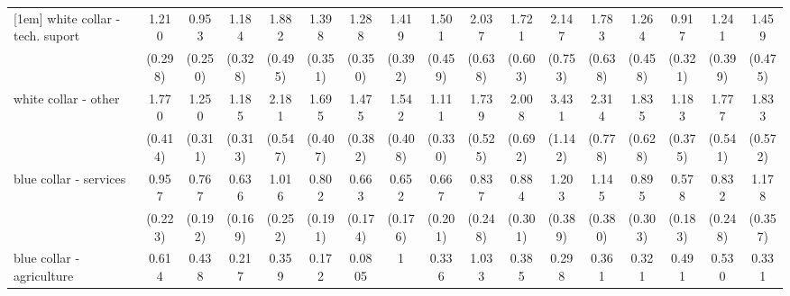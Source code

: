 {\begin{tabular}{l*{16}{c}}
[1em]
white collar - tech. suport&       1.210         &       0.953         &       1.184         &       1.882\sym{*}  &       1.398         &       1.288         &       1.419         &       1.501         &       2.037\sym{*}  &       1.721         &       2.147\sym{*}  &       1.783         &       1.264         &       0.917         &       1.241         &       1.459         \\
                    &     (0.298)         &     (0.250)         &     (0.328)         &     (0.495)         &     (0.351)         &     (0.350)         &     (0.392)         &     (0.459)         &     (0.638)         &     (0.603)         &     (0.753)         &     (0.638)         &     (0.458)         &     (0.321)         &     (0.399)         &     (0.475)         \\
[1em]
white collar - other&       1.770\sym{*}  &       1.250         &       1.185         &       2.181\sym{**} &       1.695\sym{*}  &       1.475         &       1.542         &       1.111         &       1.739         &       2.008\sym{*}  &       3.431\sym{***}&       2.314\sym{*}  &       1.835         &       1.183         &       1.777         &       1.833         \\
                    &     (0.414)         &     (0.311)         &     (0.313)         &     (0.547)         &     (0.407)         &     (0.382)         &     (0.408)         &     (0.330)         &     (0.525)         &     (0.692)         &     (1.142)         &     (0.778)         &     (0.628)         &     (0.375)         &     (0.541)         &     (0.572)         \\
[1em]
blue collar - services&       0.957         &       0.767         &       0.636         &       1.016         &       0.802         &       0.663         &       0.652         &       0.667         &       0.837         &       0.884         &       1.203         &       1.145         &       0.895         &       0.578         &       0.832         &       1.178         \\
                    &     (0.223)         &     (0.192)         &     (0.169)         &     (0.252)         &     (0.191)         &     (0.174)         &     (0.176)         &     (0.201)         &     (0.248)         &     (0.301)         &     (0.389)         &     (0.380)         &     (0.303)         &     (0.183)         &     (0.248)         &     (0.357)         \\
[1em]
blue collar - agriculture&       0.614         &       0.438         &       0.217\sym{*}  &       0.359         &       0.172\sym{*}  &      0.0805\sym{*}  &           1         &       0.336         &       1.033         &       0.385         &       0.298         &       0.361         &       0.321         &       0.491         &       0.530         &       0.331         \\

\end{tabular}}

